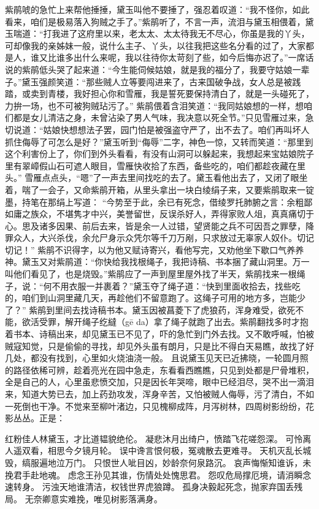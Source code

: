 \documentclass[12pt,oneside]{book}
\begin{document}
紫鹃唬的急忙上来帮他捶捶，黛玉叫他不要捶了，强忍着叹道：“我不怪你，如此看来，咱们是极易落入狗贼之手了。”紫鹃听了，不言一声，流泪与黛玉相偎着，黛玉喘道：“打我进了这府里以来，老太太、太太待我无不尽心，你虽是我的丫头，可却像我的亲姊妹一般，说什么主子、丫头，以往我把这些名分看的过了，大家都是人，谁又比谁多出什么来呢，我以往待你太苛刻了些，如今后悔亦迟了。”一席话说的紫鹃低头哭了起来道：“今生能伺候姑娘，就是我的福分了，我要守姑娘一辈子。”黛玉强颜笑道：“那些贼人立等要闯进来了，古来国破争战，女人总是被践踏，或卖到青楼，我好担心你和雪雁，我是誓死要保持清白了，就是一头碰死了，力拚一场，也不可被狗贼玷污了。”
紫鹃偎着含泪笑道：“我同姑娘想的一样，想咱们都是女儿清洁之身，未曾沾染了男人气味，我决意以死全节。”只见雪雁过来，急切说道：“姑娘快想想法子罢，园门怕是被强盗守严了，出不去了。咱们再叫坏人抓住侮辱了可怎么是好？”黛玉听到“侮辱”二字，神色一惊，又转而笑道：“那里到这个利害份上了，你们到外头看看，有没有山洞可以躲起来，我想起来宝姑娘院子里有翠嶂假山石可遮人眼目，雪雁快收拾了东西，备些吃的，咱们都趁夜藏在里头。”
雪雁点点头，“嗯”了一声去里间找吃的去了。黛玉看他出去了，又闭了眼坐着，喘了一会子，又命紫鹃开箱，从里头拿出一块白绫绢子来，又要紫鹃取来一锭墨，持笔在那绢上写道：
“今势至于此，余已有死念，借绫罗托肺腑之言：余粗鄙如庸之族众，不堪隽才中兴，美誉留世，反误杀好人，弄得家败人俎，真真痛切于心。思及诸多因果、前后去来，皆是余一人过错，望贤能之兵不可因吾之罪孽，降罪众人，大兴杀伐，余允尸身示众凭尔等千刀万剐，只求放过无辜家人奴仆。切记切记！”
紫鹃不识得字，以为他又赋诗寄兴，看他写完，又劝他坐下歇口气养养神。黛玉又对紫鹃道：“你快给我找根绳子，我把诗稿、书本捆了藏山洞里。万一叫他们看见了，也是烧毁。”紫鹃应了一声到屋里屋外找了半天，紫鹃找来一根绳子，说：“何不用衣服一并裹着？”黛玉夺了绳子道：“快到里面收拾去，找些吃的，咱们到山洞里藏几天，再趁他们不留意跑了。这绳子可用的地方多，岂能少了？”
紫鹃到里间去找诗稿书本。黛玉因被菖菱下了虎狼药，浑身难受，欲死不能，欲活受罪，解开绳子纥繨（gē da）拿了绳子就跑了出去。紫鹃翻找多时才抱着书本、诗稿出来，却见黛玉已不见了，吓的急忙到门外去找。又不敢呼喊，怕被贼寇知觉，只是偷偷的寻找，却见外头虽有朗月，只是比不得白天易瞧，故找了好几处，都没有找到，心里如火烧油浇一般。
且说黛玉见天已近拂晓，一轮圆月照的路径依稀可辨，趁着亮光在园中急走，东看看西瞧瞧，只见到处都是尸骨堆积，全是自己的人，心里虽悲愤交加，只是因长年哭啼，眼中已经泪尽，哭不出一滴泪来，知道大势已去，加上药劲攻发，浑身辛苦，又怕被贼人侮辱，污了清白，不如一死倒也干净。不觉来至柳叶渚边，只见槐柳成阵，月泻树林，四周树影纷纷，花影丛丛。正是：

红粉佳人林黛玉，才比道韫貌绝伦。
凝悲沐月出绮户，愤踏飞花嗟怨深。
可怜离人遥双看，相思今夕镜月轮。
误中谗言恨何极，冤魂散去更难寻。
天机灭乱长城毁，缟服遍地泣万门。
只恨世人呲目凶，妙龄奈何泉路沉。
哀声悔惭知谁诉，未挽君手赴地魂。
虑念王孙见其谁，伤情处处愧思君。
怨叹危局撑厄境，请消瞬念速转身。
污浊天地谁清洁，权钱世界虎狼蹲。
孤身决毅起死念，抛家弃国丢残局。
无奈卿意实难挽，唯见树影落满身。
\end{document}
